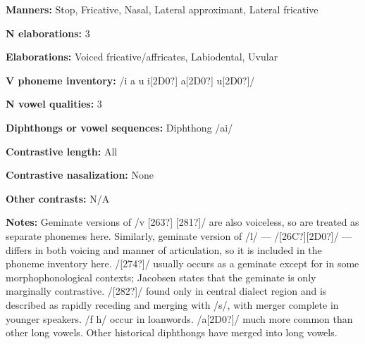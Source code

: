 \begin{styleBody}
\textbf{Manners:} Stop, Fricative, Nasal, Lateral approximant, Lateral fricative 
\end{styleBody}

\begin{styleBody}
\textbf{N elaborations:} 3
\end{styleBody}

\begin{styleBody}
\textbf{Elaborations:} Voiced fricative/affricates, Labiodental, Uvular
\end{styleBody}

\begin{styleBody}
\textbf{V phoneme inventory:} /i a u i[2D0?] a[2D0?] u[2D0?]/
\end{styleBody}

\begin{styleBody}
\textbf{N vowel qualities:} 3
\end{styleBody}

\begin{styleBody}
\textbf{Diphthongs or vowel sequences:} Diphthong /ai/
\end{styleBody}

\begin{styleBody}
\textbf{Contrastive length:} All
\end{styleBody}

\begin{styleBody}
\textbf{Contrastive nasalization:} None
\end{styleBody}

\begin{styleBody}
\textbf{Other contrasts:} N/A
\end{styleBody}

\begin{styleBody}
\textbf{Notes: }Geminate versions of /v [263?] [281?]/ are also voiceless, so are treated as separate phonemes here. Similarly, geminate version of /l/ — /[26C?][2D0?]/ — differs in both voicing and manner of articulation, so it is included in the phoneme inventory here. /[274?]/ usually occurs as a geminate except for in some morphophonological contexts; Jacobsen states that the geminate is only marginally contrastive. /[282?]/ found only in central dialect region and is described as rapidly receding and merging with /s/, with merger complete in younger speakers. /f h/ occur in loanwords. /a[2D0?]/ much more common than other long vowels. Other historical diphthongs have merged into long vowels.
\end{styleBody}

